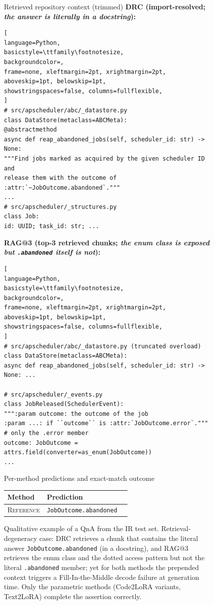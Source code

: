 \documentclass{llmxive}
\providecommand{\codelora}{Code2LoRA\xspace}
\providecommand{\textlora}{Text2LoRA\xspace}
\begin{document}
\begin{figure}[!htbp]
\begin{center}
\begin{tcolorbox}
\begin{qexsection}{Retrieved repository context (trimmed)}
\textbf{\footnotesize DRC (import-resolved; \emph{the answer is literally in a docstring}):}
\begin{lstlisting}[
language=Python,
basicstyle=\ttfamily\footnotesize,
backgroundcolor=,
frame=none, xleftmargin=2pt, xrightmargin=2pt,
aboveskip=1pt, belowskip=1pt,
showstringspaces=false, columns=fullflexible,
]
# src/apscheduler/abc/_datastore.py
class DataStore(metaclass=ABCMeta):
@abstractmethod
async def reap_abandoned_jobs(self, scheduler_id: str) -> None:
"""Find jobs marked as acquired by the given scheduler ID and
release them with the outcome of :attr:`~JobOutcome.abandoned`."""
...
# src/apscheduler/_structures.py
class Job:
id: UUID; task_id: str; ...
\end{lstlisting}
\textbf{\footnotesize RAG@3 (top-3 retrieved chunks; \emph{the enum class is exposed but \texttt{.abandoned} itself is not}):}
\begin{lstlisting}[
language=Python,
basicstyle=\ttfamily\footnotesize,
backgroundcolor=,
frame=none, xleftmargin=2pt, xrightmargin=2pt,
aboveskip=1pt, belowskip=1pt,
showstringspaces=false, columns=fullflexible,
]
# src/apscheduler/abc/_datastore.py (truncated overload)
class DataStore(metaclass=ABCMeta):
async def reap_abandoned_jobs(self, scheduler_id: str) -> None: ...

# src/apscheduler/_events.py
class JobReleased(SchedulerEvent):
""":param outcome: the outcome of the job
:param ...: if ``outcome`` is :attr:`JobOutcome.error`."""   # only the .error member
outcome: JobOutcome = attrs.field(converter=as_enum(JobOutcome))
...
\end{lstlisting}
\end{qexsection}

\begin{qexsection}{Per-method predictions and exact-match outcome}
\footnotesize
\setlength{\tabcolsep}{6pt}
\begin{tabular}{@{}llc@{}}
\toprule
Method & Prediction  \\
\midrule
\textsc{Reference}                            & \texttt{JobOutcome.abandoned}                                       & \\
\end{tabular}
\end{qexsection}


\end{tcolorbox}
\caption{Qualitative example of a QnA from the IR test set. Retrieval-degeneracy case: DRC retrieves a chunk that contains the literal answer \texttt{JobOutcome.abandoned} (in a docstring), and RAG@3 retrieves the enum class and the dotted access pattern but not the literal \texttt{.abandoned} member; yet for both methods the prepended context triggers a Fill-In-the-Middle decode failure at generation time. Only the parametric methods (\codelora{} variants, \textlora{}) complete the assertion correctly.}
\label{fig:qualitative_ir_apscheduler_245}
\end{center}
\end{figure}
\end{document}
